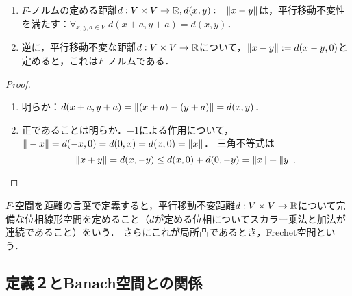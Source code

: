\documentclass[uplatex,dvipdfmx]{jsreport}
\begin{document}
\begin{lemma}\mbox{}
    \begin{enumerate}
        \item $F$-ノルムの定める距離$d:V\times V\to \mathbb{R},d(x,y):=\|x-y\|$は，平行移動不変性を満たす：$\forall_{x,y,a\in V}\;d(x+a,y+a)=d(x,y)$．
        \item 逆に，平行移動不変な距離$d:V\times V\to \mathbb{R}$について，$\|x-y\|:=d(x-y,0)$と定めると，これは$F$-ノルムである．
    \end{enumerate}
\end{lemma}
\begin{proof}\mbox{}
    \begin{enumerate}
        \item 明らか：$d(x+a,y+a)=\|(x+a)-(y+a)\|=d(x,y)$．
        \item 正であることは明らか．$-1$による作用について，$\|-x\|=d(-x,0)=d(0,x)=d(x,0)=\|x\|$．
        三角不等式は
        \[\|x+y\|=d(x,-y)\le d(x,0)+d(0,-y)=\|x\|+\|y\|.\]
    \end{enumerate}
\end{proof}
\begin{remarks}[距離の言葉による特徴付け]
    $F$-空間を距離の言葉で定義すると，平行移動不変距離$d:V\times V\to \mathbb{R}$について完備な位相線形空間を定めること（$d$が定める位相についてスカラー乗法と加法が連続であること）をいう．
    さらにこれが局所凸であるとき，Frechet空間という．
\end{remarks}

\subsection{定義２とBanach空間との関係}
\end{document}
